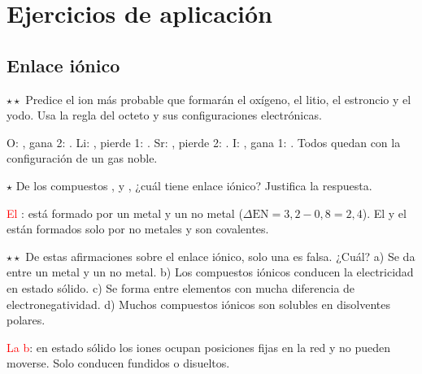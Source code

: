 \section{Ejercicios de aplicación}\label{sec:ud4-aplicacion}

\subsection{Enlace iónico}

\begin{exercise}
    \(\star\star\) Predice el ion más probable que formarán el oxígeno, el litio, el estroncio y el yodo. Usa la regla del octeto
    y sus configuraciones electrónicas.
    \begin{solu}
        O: , gana 2: \textcolor{red}{}. Li: , pierde 1: \textcolor{red}{}.
        Sr: , pierde 2: \textcolor{red}{}. I: , gana 1:
        \textcolor{red}{}. Todos quedan con la configuración de un gas noble.
    \end{solu}
\end{exercise}

\begin{exercise}
    \(\star\) De los compuestos ,  y , ¿cuál tiene enlace iónico? Justifica la respuesta.
    \begin{solu}
        \textcolor{red}{El }: está formado por un metal y un no metal (\(\Delta\mathrm{EN} = 3{,}2 - 0{,}8 = 2{,}4\)). El
         y el  están formados solo por no metales y son covalentes.
    \end{solu}
\end{exercise}

\begin{exercise}
    \(\star\star\) De estas afirmaciones sobre el enlace iónico, solo una es falsa. ¿Cuál? a) Se da entre un metal y un no metal.
    b) Los compuestos iónicos conducen la electricidad en estado sólido. c) Se forma entre elementos con mucha diferencia de
    electronegatividad. d) Muchos compuestos iónicos son solubles en disolventes polares.
    \begin{solu}
        \textcolor{red}{La b}: en estado sólido los iones ocupan posiciones fijas en la red y no pueden moverse. Solo conducen
        fundidos o disueltos.
    \end{solu}
\end{exercise}

